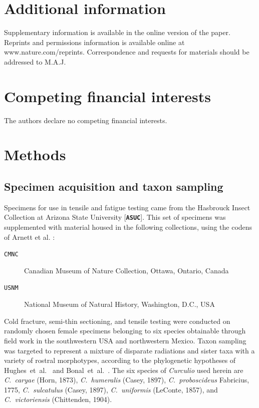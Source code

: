 \documentclass[twocolumn, linenumbers, superscriptaddress, nofootinbib]{revtex4-1}
\begin{document}
	\section*{Additional information}
		Supplementary information is available in the online version of the paper.
		Reprints and permissions information is available online at www.nature.com/reprints.
		Correspondence and requests for materials should be addressed to M.A.J.
	
	\section*{Competing financial interests}
		The authors declare no competing financial interests.
	
	\newpage

	\section*{Methods}
		\subsection*{Specimen acquisition and taxon sampling}
			Specimens for use in tensile and fatigue testing came from the Hasbrouck Insect Collection at Arizona State University [\textbf{\texttt{ASUC}}].  This set of specimens was supplemented with material housed in the following collections, using the codens of Arnett et al. \cite{Arnett1993}:
			
			\begin{description}
				\item [\texttt{CMNC}]  Canadian Museum of Nature Collection, Ottawa, Ontario, Canada
				\item [\texttt{USNM}]  National Museum of Natural History, Washington, D.C., USA
			\end{description}
		
			Cold fracture, semi-thin sectioning, and tensile testing were conducted on randomly chosen female specimens belonging to six species obtainable through field work in the southwestern USA and northwestern Mexico.
			Taxon sampling was targeted to represent a mixture of disparate radiations and sister taxa with a variety of rostral morphotypes, according to the phylogenetic hypotheses of Hughes~et~al.~\cite{Hughes2004eco, Hughes2004phylo} and Bonal~et~al.~\cite{Bonal2016}.
			The six species of \textit{Curculio} used herein are \textit{C.~caryae} (Horn, 1873), \textit{C.~humeralis} (Casey, 1897), \textit{C.~proboscideus} Fabricius, 1775, \textit{C.~sulcatulus} (Casey, 1897), \textit{C.~uniformis} (LeConte, 1857), and \textit{C.~victoriensis} (Chittenden, 1904).
	
\end{document}
